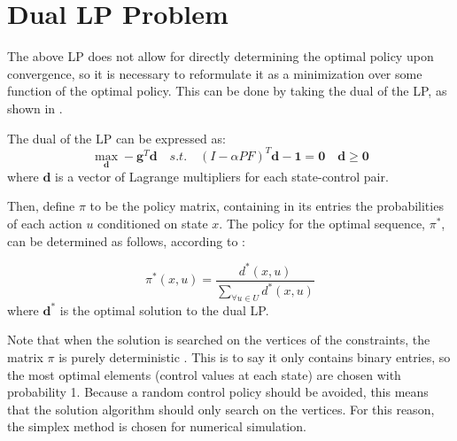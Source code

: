 \documentclass[conference]{IEEEtran}
\begin{document}
\section{Dual LP Problem}
The above LP does not allow for directly determining the optimal policy upon convergence, so it is necessary to reformulate it as a minimization over some function of the optimal policy. This can be done by taking the dual of the LP, as shown in \cite{4220813}.

The dual of the LP can be expressed as:
\begin{equation}
    \max_{\boldsymbol{d}} -\boldsymbol{g}^{T} \boldsymbol{d}
    \hspace{1em}s.t.\hspace{1em}(I-\alpha PF)^{T}\boldsymbol{d} - \boldsymbol{1} = \boldsymbol{0}\hspace{1em}\boldsymbol{d} \geq \boldsymbol{0}
\end{equation}
where $\boldsymbol{d}$ is a vector of Lagrange multipliers for each state-control pair.


Then, define $\pi$ to be the policy matrix, containing in its entries the probabilities of each action $u$ conditioned on state $x$. The policy for the optimal sequence, $\pi^{*}$, can be determined as follows, according to \cite{4220813}:

\begin{equation}
\pi^{*}(x,u)=\frac{d^{*}(x,u)}{\sum_{\forall u \in U}d^{*}(x,u)}
\end{equation} where $\boldsymbol{d^{*}}$ is the optimal solution to the dual LP.

Note that when the solution is searched on the vertices of the constraints, the matrix $\pi$ is purely deterministic \cite{MDPs}. This is to say it only contains binary entries, so the most optimal elements (control values at each state) are chosen with probability 1. Because a random control policy should be avoided, this means that the solution algorithm should only search on the vertices. For this reason, the simplex method is chosen for numerical simulation.

\end{document}
